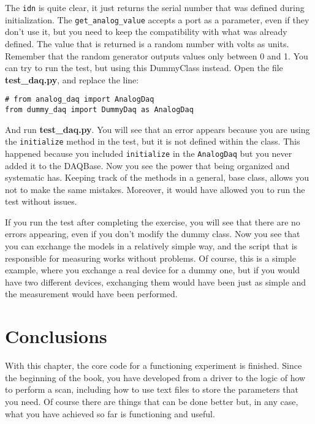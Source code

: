 The \texttt{idn} is quite clear, it just returns the serial number that
was defined during initialization. The \texttt{get_analog_value}
accepts a port as a parameter, even if they don't use it, but you need
to keep the compatibility with what was already defined. The value that
is returned is a random number with volts as units. Remember that the
random generator outputs values only between 0 and 1. You can try to run
the test, but using this DummyClass instead. Open the file
\textbf{test\_daq.py}, and replace the line:

\begin{verbatim}
# from analog_daq import AnalogDaq
from dummy_daq import DummyDaq as AnalogDaq
\end{verbatim}

And run \textbf{test\_daq.py}. You will see that an error appears
because you are using the \texttt{initialize} method in the test, but it
is not defined within the class. This happened because you included
\texttt{initialize} in the
\texttt{AnalogDaq} but you never added it to the DAQBase.
Now you see the power that being organized and systematic has. Keeping
track of the methods in a general, base class, allows you not to make
the same mistakes. Moreover, it would have allowed you to run the test
without issues.


If you run the test after completing the exercise, you will see that
there are no errors appearing, even if you don't modify the dummy class.
Now you see that you can exchange the models in a relatively simple way,
and the script that is responsible for measuring works without problems.
Of course, this is a simple example, where you exchange a real device
for a dummy one, but if you would have two different devices, exchanging
them would have been just as simple and the measurement would have
been performed.


\section{Conclusions}\label{conclusions}
With this chapter, the core code for a functioning experiment is
finished. Since the beginning of the book, you have developed from a
driver to the logic of how to perform a scan, including how to use text
files to store the parameters that you need. Of course there are things
that can be done better but, in any case, what you have achieved so far
is functioning and useful.


